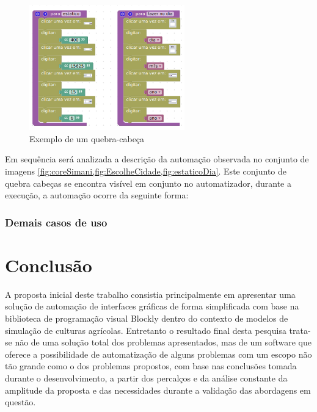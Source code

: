 \documentclass[tg]{mdtufsm}
\begin{document}
                    \begin{figure}[!htb]
                        {\centering
                        \includegraphics[width=0.6\textwidth]{imagens/estaticoDia.png}
                        \caption{Exemplo de um quebra-cabeça}
                        \label{fig:estaticoDia}}
                    \end{figure}

                    Em sequência será analizada a descrição da automação observada no conjunto de imagens \ref{fig:coreSimani,fig:EscolheCidade,fig:estaticoDia}. Este conjunto de quebra cabeças se encontra visível em conjunto no automatizador, durante a execução, a automação ocorre da seguinte forma:

                    \begin{enumerate}[label*=\arabic*.]

                    \end{enumerate}

                \subsection{Demais casos de uso}


        \chapter {Conclusão}

            A proposta inicial deste trabalho consistia principalmente em apresentar uma solução de automação de interfaces gráficas de forma simplificada com base na biblioteca de programação visual Blockly dentro do contexto de modelos de simulação de culturas agrícolas. Entretanto o resultado final desta pesquisa trata-se não de uma solução total dos problemas apresentados, mas de um software que oferece a possibilidade de automatização de alguns problemas com um escopo não tão grande como o dos problemas propostos, com base nas conclusões tomada durante o desenvolvimento, a partir dos percalços e da análise constante da amplitude da proposta e das necessidades durante a validação das abordagens em questão.
\end{document}
